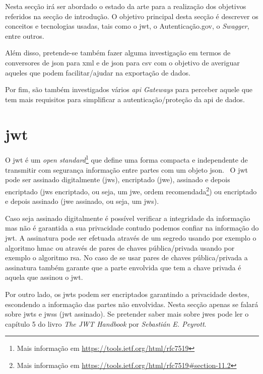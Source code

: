 Nesta secção irá ser abordado o estado da arte para a realização dos objetivos referidos na secção de introdução. O objetivo principal desta secção é descrever os conceitos e tecnologias usadas, tais como o \acrshort{jwt}, o Autenticação.gov, o \textit{Swagger}, entre outros. 

Além disso, pretende-se também fazer alguma investigação em termos de conversores de \acrshort{json} para \acrshort{xml} e de \acrshort{json} para \acrshort{csv} com o objetivo de averiguar aqueles que podem facilitar/ajudar na exportação de dados.

Por fim, são também investigados vários \textit{\acrshort{api} Gateways} para perceber aquele que tem mais requisitos para simplificar a autenticação/proteção da \acrshort{api} de dados.

\section{\acrfull{jwt}}
O \acrshort{jwt} é um \textit{open standard}\footnote{Mais informação em \url{https://tools.ietf.org/html/rfc7519}} que define uma forma compacta e independente de transmitir com segurança informação entre partes com um objeto \acrshort{json}.~\cite{jwtio} O \acrshort{jwt} pode ser assinado digitalmente (\acrshort{jws}), encriptado (\acrshort{jwe}), assinado e depois encriptado (\acrshort{jws} encriptado, ou seja, um \acrshort{jwe}, ordem recomendada\footnote{Mais informação em \url{https://tools.ietf.org/html/rfc7519\#section-11.2}}) ou encriptado e depois assinado (\acrshort{jwe} assinado, ou seja, um \acrshort{jws}).

Caso seja assinado digitalmente é possível verificar a integridade da informação mas não é garantida a sua privacidade contudo podemos confiar na informação do \acrshort{jwt}. A assinatura pode ser efetuada através de um segredo usando por exemplo o algoritmo \acrshort{hmac} ou através de pares de chaves pública/privada usando por exemplo o algoritmo \acrshort{rsa}. No caso de se usar pares de chaves pública/privada a assinatura também garante que a parte envolvida que tem a chave privada é aquela que assinou o \acrshort{jwt}.

Por outro lado, os \acrshort{jwt}s podem ser encriptados garantindo a privacidade destes, escondendo a informação das partes não envolvidas. Nesta secção apenas se falará sobre \acrshort{jwt}s e \acrshort{jws}s (\acrshort{jwt} assinado). Se pretender saber mais sobre \acrshort{jwe}s pode ler o capítulo 5 do livro \textit{The JWT Handbook} por \textit{Sebastián E. Peyrott}.


